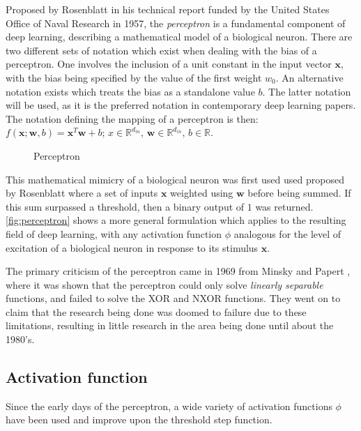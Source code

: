 Proposed by Rosenblatt \cite{Rosenblatt_1957_6098} in his technical
report funded by the United States Office of Naval Research
\cite{doi:10.1177/030631296026003005} in 1957, the \textit{perceptron} is a
fundamental component of deep learning, describing a mathematical model of a
biological neuron. There are two different sets of notation which exist when
dealing with the bias of a perceptron. One involves the inclusion of a unit
constant in the input vector $\mathbf{x}$, with the bias being specified by the
value of the first weight $w_0$. An alternative notation exists which treats the
bias as a standalone value $b$. The latter notation will be used, as it is the
preferred notation in contemporary deep learning papers. The notation defining
the mapping of a perceptron is then: $f(\mathbf{x};\mathbf{w},
b)=\mathbf{x}^T\mathbf{w}+b$; $x\in\mathbb{R}^{d_{in}}$,
$\mathbf{w}\in\mathbb{R}^{d_{in}}$, $b\in\mathbb{R}$.

\begin{figure}[htbp]
    \centering
    
    \caption{Perceptron}
    \label{fig:perceptron}
\end{figure}

This mathematical mimicry of a biological neuron was first used used proposed by
Rosenblatt where a set of inputs $\mathbf{x}$ weighted using $\mathbf{w}$ before
being summed. If this sum surpassed a threshold, then a binary output of $1$ was
returned. \autoref{fig:perceptron} shows a more general formulation which
applies to the resulting field of deep learning, with any activation function
$\phi$ analogous for the level of excitation of a biological neuron in response
to its stimulus $\mathbf{x}$.

The primary criticism of the perceptron came in 1969 from Minsky and Papert
\cite{minsky69perceptrons}, where it was shown that the perceptron could only
solve \textit{linearly separable} functions, and failed to solve the XOR and
NXOR functions. They went on to claim that the research being done was doomed to
failure due to these limitations, resulting in little research in the area being
done until about the 1980's.

\subsection{Activation function}

Since the early days of the perceptron, a wide variety of activation functions
$\phi$ have been used and improve upon the threshold step function.

